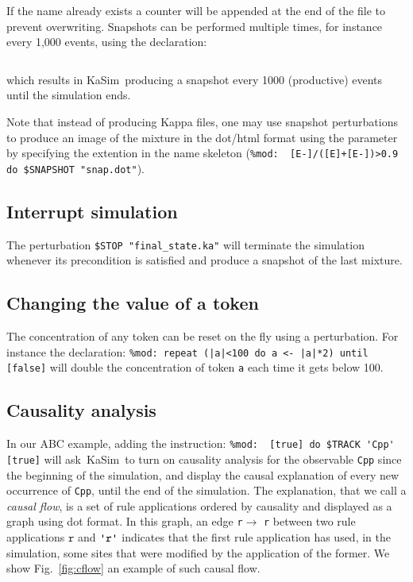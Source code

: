 \documentclass[11pt]{book}
\def\KaSim{\textsf{KaSim}}
\def\ttt#1{\texttt{#1}}
\def\noi{\noindent}
\begin{document}
If the name already exists a counter will be appended at the end of
the file to prevent overwriting. Snapshots can be performed multiple
times, for instance every 1,000 events, using the
declaration:
\begin{lstlisting}[language=kappa]
%mod: repeat ([E] [mod] 1000)=0 do $SNAPSHOT "abc.ka" until [false]
\end{lstlisting}
which results in \KaSim~producing a snapshot every 1000 (productive) events until the simulation ends.

Note that instead of producing Kappa files, one may use snapshot perturbations to produce an image of the mixture in the dot/html format using the parameter by specifying the extention in the name skeleton (\lstinline[language=kappa]!%mod:  [E-]/([E]+[E-])>0.9 do $SNAPSHOT "snap.dot"!).

\subsection{Interrupt simulation}
The perturbation \ttt{\$STOP "final\_state.ka"} will terminate the
simulation whenever its precondition is satisfied and produce a
snapshot of the last mixture.

\subsection{Changing the value of a token}
The concentration of any token can be reset on the fly using a perturbation. For instance the declaration:
\lstinline[language=kappa]!%mod: repeat (|a|<100 do a <- |a|*2) until [false]!
will double the concentration of token \ttt{a} each time it gets below 100.

\subsection{Causality analysis}\label{sec:cflows}

In our ABC example, adding the instruction:
\lstinline[language=kappa]!%mod:  [true] do $TRACK 'Cpp' [true]!
\noi will ask~\KaSim~to turn on causality analysis for the observable \ttt{{\textquotesingle}Cpp{\textquotesingle}} since the beginning of the simulation, and display the causal explanation of every new occurrence of \ttt{{\textquotesingle}Cpp{\textquotesingle}}, until the end of the simulation. The explanation, that we call a \emph{causal flow}, is a set of rule applications ordered by causality and displayed as a graph using dot format. In this graph, an edge \ttt{r}$\longrightarrow$ \ttt{r{\textquotesingle}} between two rule applications $\ttt{r}$ and $\ttt{{\textquotesingle}r{\textquotesingle}}$ indicates that the first rule application has used, in the simulation, some sites that were modified by the application of the former. We show Fig.~\ref{fig:cflow} an example of such causal flow.
\end{document}
